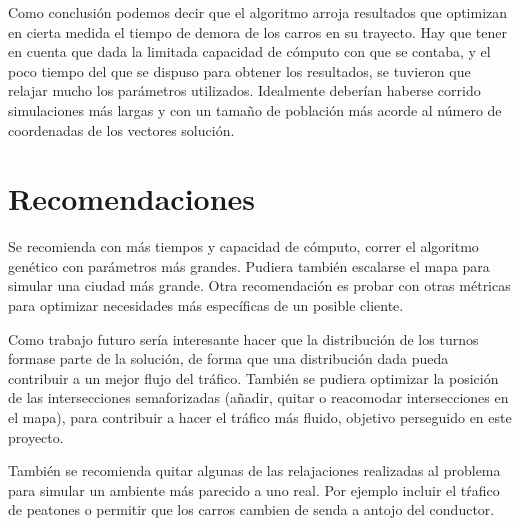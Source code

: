 \documentclass[colorinlistoftodos,twoside,twocolumn]{article} %
\begin{document}
	Como conclusi\'on podemos decir que el algoritmo arroja resultados que optimizan en cierta medida el tiempo de demora de los carros en su trayecto. Hay que tener en cuenta que dada la limitada capacidad de c\'omputo con que se contaba, y el poco tiempo del que se dispuso para obtener los resultados, se tuvieron que relajar mucho los par\'ametros utilizados. Idealmente deber\'ian haberse corrido simulaciones m\'as largas y con un tama\~no de poblaci\'on m\'as acorde al n\'umero de coordenadas de los vectores soluci\'on.

	\section{Recomendaciones}
	
	
	
	Se recomienda con m\'as tiempos y capacidad de c\'omputo, correr el algoritmo gen\'etico con par\'ametros m\'as grandes. Pudiera tambi\'en escalarse el mapa para simular una ciudad m\'as grande. Otra recomendaci\'on es probar con otras m\'etricas para optimizar  necesidades m\'as espec\'ificas de un posible cliente.
	
	Como trabajo futuro ser\'ia interesante hacer que la distribuci\'on de los turnos formase parte de la soluci\'on, de forma que una distribuci\'on dada pueda contribuir a un mejor flujo del tr\'afico. Tambi\'en se pudiera optimizar la posici\'on de las intersecciones semaforizadas (a\~nadir, quitar o reacomodar intersecciones en el mapa), para contribuir a hacer el tr\'afico m\'as fluido, objetivo perseguido en este proyecto.
	
	Tambi\'en se recomienda quitar algunas de las relajaciones realizadas al problema para simular un ambiente m\'as parecido  a uno real. Por ejemplo incluir el t\'rafico de peatones o permitir que los carros cambien de senda a antojo del conductor.
	
\end{document}
